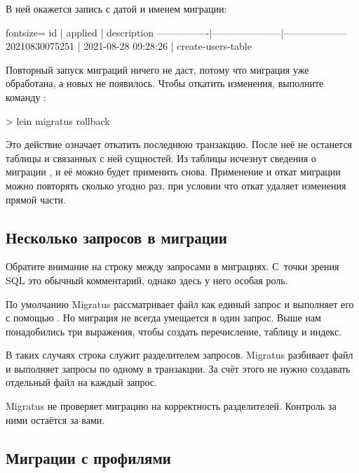 В ней окажется запись с датой и именем миграции:

\begin{english}
  \begin{text*}{fontsize=\small}
         id     |       applied       |      description
----------------|---------------------|--------------------
 20210830075251 | 2021-08-28 09:28:26 | create-users-table
  \end{text*}
\end{english}

Повторный запуск миграций ничего не даст, потому что миграция  уже обработана, а новых не появилось. Чтобы откатить изменения, выполните команду :

\begin{english}
  \begin{clojure}
> lein migratus rollback
  \end{clojure}
\end{english}

Это действие означает откатить последнюю транзакцию. После неё не останется таблицы  и связанных с ней сущностей. Из таблицы  исчезнут сведения о миграции , и её можно будет применить снова. Применение и откат миграции можно повторять сколько угодно раз, при условии что откат удаляет изменения прямой части.

\subsection{Несколько запросов в миграции}

Обратите внимание на строку \code{--;;} между запросами в миграциях. С~точки зрения SQL это обычный комментарий, однако здесь у него особая роль.

По умолчанию Migratus рассматривает файл как единый запрос и выполняет его с помощью . Но миграция не всегда умещается в один запрос.
Выше нам понадобились три выражения, чтобы создать перечисление, таблицу и индекс.

В таких случаях строка \code{--;;} служит разделителем запросов. Migratus разбивает файл и выполняет запросы по одному в транзакции. За счёт этого не нужно создавать отдельный файл на каждый запрос.

Migratus не проверяет миграцию на корректность разделителей. Контроль за ними остаётся за вами.

\subsection{Миграции с профилями}

